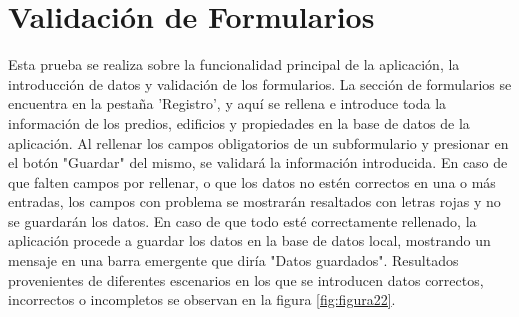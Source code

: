 \section{Validación de Formularios}
Esta prueba se realiza sobre la funcionalidad principal de la aplicación, la introducción de datos y validación de los formularios. La sección de formularios se encuentra en la
pestaña 'Registro', y aquí se rellena e introduce toda la información de los predios, edificios y propiedades en la base de datos de la aplicación. Al rellenar los campos obligatorios
de un subformulario y presionar en el botón "Guardar"$ $ del mismo, se validará la información introducida. En caso de que falten campos por rellenar, o que los datos no estén correctos en
una o más entradas, los campos con problema se mostrarán resaltados con letras rojas y no se guardarán los datos. En caso de que todo esté correctamente rellenado, la aplicación procede a
guardar los datos en la base de datos local, mostrando un mensaje en una barra emergente que diría "$ $Datos guardados"$ $. Resultados provenientes de diferentes escenarios en los que se introducen
datos correctos, incorrectos o incompletos se observan en la figura \ref{fig:figura22}.
